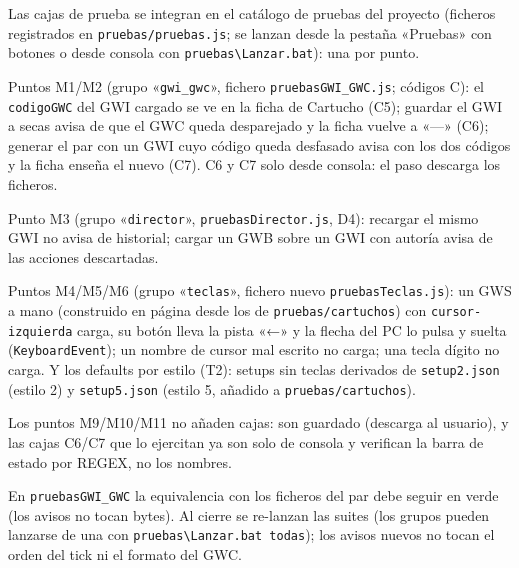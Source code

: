 Las cajas de prueba se integran en el catálogo de pruebas del proyecto (ficheros registrados en \texttt{pruebas/pruebas.js}; se lanzan desde la pestaña «Pruebas» con botones o desde consola con \texttt{pruebas\textbackslash Lanzar.bat}): una por punto.

Puntos M1/M2 (grupo «\texttt{gwi\_gwc}», fichero \texttt{pruebasGWI\_GWC.js}; códigos C): el \texttt{codigoGWC} del GWI cargado se ve en la ficha de Cartucho (C5); guardar el GWI a secas avisa de que el GWC queda desparejado y la ficha vuelve a «---» (C6); generar el par con un GWI cuyo código queda desfasado avisa con los dos códigos y la ficha enseña el nuevo (C7). C6 y C7 solo desde consola: el paso descarga los ficheros.

Punto M3 (grupo «\texttt{director}», \texttt{pruebasDirector.js}, D4): recargar el mismo GWI no avisa de historial; cargar un GWB sobre un GWI con autoría avisa de las acciones descartadas.

Puntos M4/M5/M6 (grupo «\texttt{teclas}», fichero nuevo \texttt{pruebasTeclas.js}): un GWS a mano (construido en página desde los de \texttt{pruebas/cartuchos}) con \texttt{cursor-izquierda} carga, su botón lleva la pista «←» y la flecha del PC lo pulsa y suelta (\texttt{KeyboardEvent}); un nombre de cursor mal escrito no carga; una tecla dígito no carga. Y los defaults por estilo (T2): setups sin teclas derivados de \texttt{setup2.json} (estilo 2) y \texttt{setup5.json} (estilo 5, añadido a \texttt{pruebas/cartuchos}).

Los puntos M9/M10/M11 no añaden cajas: son guardado (descarga al usuario), y las cajas C6/C7 que lo ejercitan ya son solo de consola y verifican la barra de estado por REGEX, no los nombres.

En \texttt{pruebasGWI\_GWC} la equivalencia con los ficheros del par debe seguir en verde (los avisos no tocan bytes). Al cierre se re-lanzan las suites (los grupos pueden lanzarse de una con \texttt{pruebas\textbackslash Lanzar.bat todas}); los avisos nuevos no tocan el orden del tick ni el formato del GWC.

